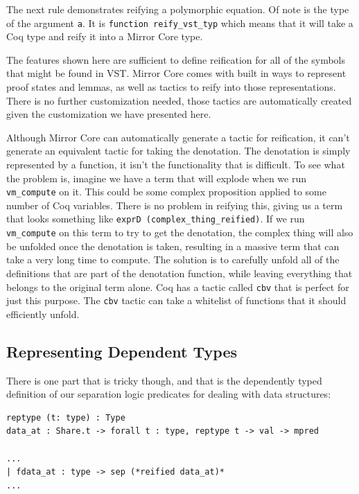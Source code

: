 \documentclass{puthesis}
\begin{document}
The next rule demonstrates reifying a polymorphic equation. Of note is
the type of the argument \lstinline|a|. It is 
\lstinline|function reify_vst_typ| which means that it will take a Coq type and reify it
into a Mirror Core type.

The features shown here are sufficient to define reification for all
of the symbols that might be found in VST. Mirror Core comes with
built in ways to represent proof states and lemmas, as well as tactics
to reify into those representations. There is no further customization
needed, those tactics are automatically created given the
customization we have presented here. 

Although Mirror Core can automatically generate a tactic for
reification, it can't generate an equivalent tactic for taking the
denotation. The denotation is simply represented by a function, it
isn't the functionality that is difficult. To see what the problem is,
imagine we have a term that will explode when we run
\lstinline|vm_compute| on it. This could be some complex proposition
applied to some number of Coq variables. There is no problem in
reifying this, giving us a term that looks something like 
\lstinline|exprD (complex_thing_reified)|. If we run
\lstinline|vm_compute| on this term to try to get the denotation, the
complex thing will also be unfolded once the denotation is taken,
resulting in a massive term that can take a very long time to
compute. The solution is to carefully unfold all of the definitions
that are part of the denotation function, while leaving everything
that belongs to the original term alone. Coq has a tactic called
\lstinline|cbv| that is perfect for just this purpose. The
\lstinline|cbv| tactic can take a whitelist of functions that it
should efficiently unfold. 

\subsection{Representing Dependent Types}
\label{sub:dependent}
There is one part that is tricky though, and that is the dependently
typed definition of our separation logic predicates for dealing with
data structures:

\begin{lstlisting}
reptype (t: type) : Type
data_at : Share.t -> forall t : type, reptype t -> val -> mpred

...
| fdata_at : type -> sep (*reified data_at)*
...
\end{lstlisting}
\end{document}
